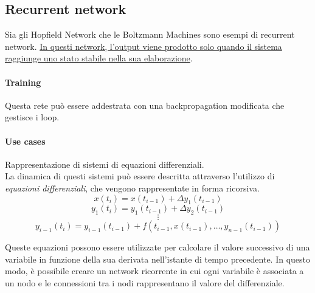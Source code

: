\subsection{Recurrent network}
Sia gli Hopfield Network che le Boltzmann Machines sono esempi di recurrent network. \uline{In questi network, l'output viene prodotto solo quando il sistema raggiunge uno stato stabile nella sua elaborazione}.

\paragraph{Training}
Questa rete può essere addestrata con una backpropagation modificata che gestisce i loop.

\paragraph{Use cases}
Rappresentazione di sistemi di equazioni differenziali.\\
La dinamica di questi sistemi può essere descritta attraverso l'utilizzo di \textit{equazioni differenziali}, che vengono rappresentate in forma ricorsiva. 
$$x(t_i) = x(t_{i-1}) + \Delta y_1(t_{i-1})$$
$$y_1(t_i) = y_1(t_{i-1}) + \Delta y_2(t_{i-1})$$
$$\vdots$$
$$y_{i-1}(t_i) = y_{i-1}(t_{i-1}) + f(t_{i-1}, x(t_{i-1}), \dots, y_{n-1}(t_{i-1}))$$

Queste equazioni possono essere utilizzate per calcolare il valore successivo di una variabile in funzione della sua derivata nell'istante di tempo precedente. In questo modo, è possibile creare un network ricorrente in cui ogni variabile è associata a un nodo e le connessioni tra i nodi rappresentano il valore del differenziale.

\newpage